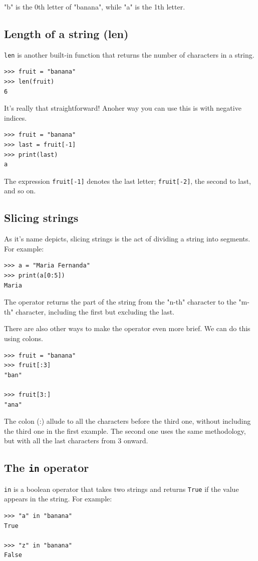 "b" is the 0th letter of "banana", while "a" is the 1th letter. 

\subsection{Length of a string (len)}
\texttt{len} is another built-in function that returns the number of characters in a string.
\begin{verbatim}
>>> fruit = "banana"
>>> len(fruit)
6
\end{verbatim}

It's really that straightforward! Anoher way you can use this is with negative indices.
\begin{verbatim}
>>> fruit = "banana"
>>> last = fruit[-1]
>>> print(last)
a
\end{verbatim}

The expression \texttt{fruit[-1]} denotes the last letter; \texttt{fruit[-2]}, the second to last, and so on.

\subsection{Slicing strings}
As it's name depicts, slicing strings is the act of dividing a string into segments. For example:
\begin{verbatim}
>>> a = "Maria Fernanda"
>>> print(a[0:5])
Maria
\end{verbatim}

The operator returns the part of the string from the "n-th" character to the "m-th" character, including the first but excluding the last.

There are also other ways to make the operator even more brief. We can do this using colons. 
\begin{verbatim}
>>> fruit = "banana"
>>> fruit[:3]
"ban"

>>> fruit[3:]
"ana"
\end{verbatim}

The colon (:) allude to all the characters before the third one, without including the third one in the first example. The second one uses the same methodology, but with all the last characters from 3 onward. 

\subsection{The \texttt{in} operator}
\texttt{in} is a boolean operator that takes two strings and returns \texttt{True} if the value appears in the string. For example:
\begin{verbatim}
>>> "a" in "banana"
True

>>> "z" in "banana"
False
\end{verbatim}

